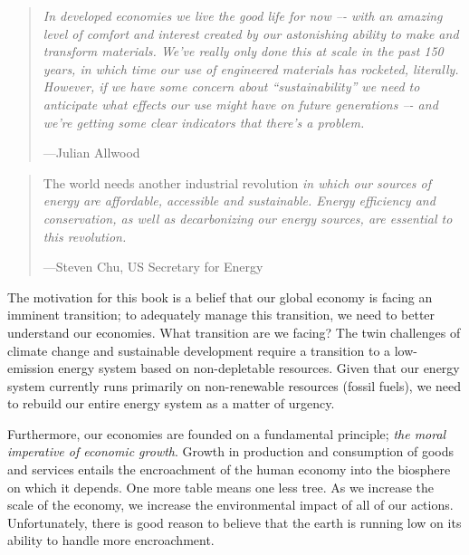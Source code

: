 \begin{quotation}
	\emph{In developed economies we live the good life for now –-
	with an amazing level of comfort and interest 
	created by our astonishing ability to 
	make and transform materials. 
	We've really only done this at scale in the past 150 years, 
	in which time our use of engineered materials has rocketed, 
	literally. 
	However, if we have some concern about ``sustainability''
	we need to anticipate what effects our use might have 
	on future generations –-
	and we're getting some clear indicators that there's a 
	problem.}~\cite[p.~3]{allwood2012sustainable}

	\hfill---Julian Allwood
\end{quotation}

\begin{quotation}
	The world needs another industrial revolution 
	\emph{in which our sources of energy are affordable, 
	accessible and sustainable. 
	Energy efficiency and conservation, 
	as well as decarbonizing our energy sources, 
	are essential to this revolution.}~\cite[p.~294]{Chu2012}

	\hfill---Steven Chu, US Secretary for Energy
\end{quotation}

The motivation for this book
is a belief that our global economy is
facing an imminent transition;
to adequately manage this transition,
we need to better understand our economies.
What transition are we facing? 
The twin challenges of climate change and 
sustainable development require a transition to a
low-emission energy system based on 
non-depletable resources. 
Given that our energy system currently runs
primarily on non-renewable resources (fossil fuels),
we need to rebuild our entire energy
system as a matter of urgency.

Furthermore,
our economies are founded on a fundamental principle;
\emph{the moral imperative of economic growth}.\cite{Daly1995}
Growth in production and consumption of goods and services
entails the encroachment of the human economy into the
biosphere on which it depends.
One more table means one less tree.
As we increase the scale of the economy,
we increase the environmental impact of all of our actions.
Unfortunately, there is good reason to believe that the earth 
is running low on its ability to handle more encroachment.\cite{UNMEA2005}


